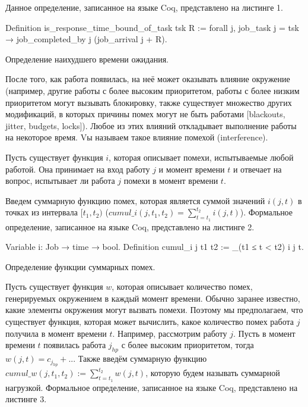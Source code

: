 \documentclass[14pt]{matmex-diploma-custom}
\begin{document}
Данное определение, записанное на языке Coq, представлено на листинге 1.
  
\begin{listing} 
\begin{pyglist}[numbers=none,numbersep=5pt, fontsize=\small]
  Definition is_response_time_bound_of_task tsk R :=
    forall j,
      job_task j = tsk →
      job_completed_by j (job_arrival j + R).
\end{pyglist}
\caption{Определение наихудшего времени ожидания.}
\label{lst:def:rtb}   
\end{listing}


После того, как работа появилась, на неё может оказывать влияние окружение (например, 
  другие работы с более высоким приоритетом, работы с более низким приоритетом могут 
  вызывать блокировку, также существует множество других модификаций, в 
  которых причины помех могут не быть работами [blackouts, jitter, budgets, locks]). 
  Любое из этих влияний откладывает выполнение работы на некоторое время.
  Vы называем такое влияние помехой (interference). 
  
Пусть существует функция $i$, которая описывает помехи, испытываемые любой работой. Она 
  принимает на вход работу $j$ и момент времени $t$ и отвечает 
  на вопрос, испытывает ли работа $j$ помехи в момент времени $t$. 
  
Введем суммарную функцию помех, которая является суммой значений $i(j,t)$ 
  в точках из интервала $[t_1, t_2)$ ($cumul\_i(j,t_1,t_2) = \sum_{t = t_1}^{t_2} i(j,t)$).
  Формальное определение, записанное на языке Coq, представлено на листинге 2.

   
\begin{listing} 
\begin{pyglist}[numbers=none,numbersep=5pt, fontsize=\small]
  Variable i: Job → time → bool.
  Definition cumul_i j t1 t2 := 
    \sum_(t1 ≤ t < t2) i j t.
\end{pyglist}
\caption{Определение функции суммарных помех.}
\label{lst:theorem2}   
\end{listing}

Пусть существует функция $w$, которая описывает количество помех, 
  генерируемых окружением в каждый момент времени. Обычно заранее известно, какие 
  элементы окружения могут вызвать помехи. Поэтому мы предполагаем, что существует 
  функция, которая может вычислить, какое количество помех работа $j$ получила в 
  момент времени $t$. Например, рассмотрим работу $j$. Пусть в момент времени $t$ 
  появилась работа $j_{hp}$ с более высоким приоритетом, тогда $w(j,t) = c_{j_{hp}} + ..$. 
  Также введём суммарную функцию $cumul\_w(j,t_1,t_2) := \sum_{t = t_1}^{t_2} w(j,t)$, 
  которую будем называть суммарной нагрузкой. 
  Формальное определение, записанное на языке Coq, представлено на листинге 3.
  
\end{document}
